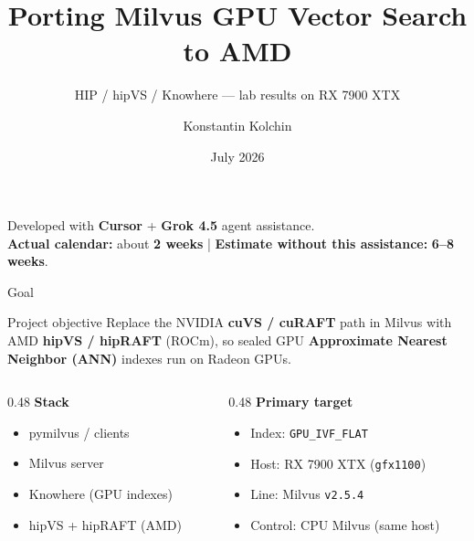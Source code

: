 \documentclass[aspectratio=169,11pt]{beamer}
\title{Porting Milvus GPU Vector Search to AMD}
\subtitle{HIP / hipVS / Knowhere --- lab results on RX 7900 XTX}
\author{Konstantin Kolchin}
\date{July 2026}
\begin{document}
\begin{frame}[fragile]
  \titlepage
  \vspace{0.4em}
  \begin{center}
    \small
    Developed with \textbf{Cursor} + \textbf{Grok 4.5} agent assistance.\\[0.4em]
    \textbf{Actual calendar:} about \textbf{2 weeks}
    \quad|\quad
    \textbf{Estimate without this assistance:} \textbf{6--8 weeks}.
  \end{center}
\end{frame}

\begin{frame}{Goal}
  \begin{block}{Project objective}
    Replace the NVIDIA \textbf{cuVS / cuRAFT} path in Milvus with AMD
    \textbf{hipVS / hipRAFT} (ROCm), so sealed GPU
    \textbf{Approximate Nearest Neighbor (ANN)} indexes run on Radeon GPUs.
  \end{block}

  \vspace{0.5em}
  \begin{columns}[T]
    \begin{column}{0.48\textwidth}
      \textbf{Stack}
      \begin{itemize}
        \item pymilvus / clients
        \item Milvus server
        \item Knowhere (GPU indexes)
        \item hipVS + hipRAFT (AMD)
      \end{itemize}
    \end{column}
    \begin{column}{0.48\textwidth}
      \textbf{Primary target}
      \begin{itemize}
        \item Index: \texttt{GPU\_IVF\_FLAT}
        \item Host: RX 7900 XTX (\texttt{gfx1100})
        \item Line: Milvus \texttt{v2.5.4}
        \item Control: CPU Milvus (same host)
      \end{itemize}
    \end{column}
  \end{columns}
\end{frame}
\end{document}
